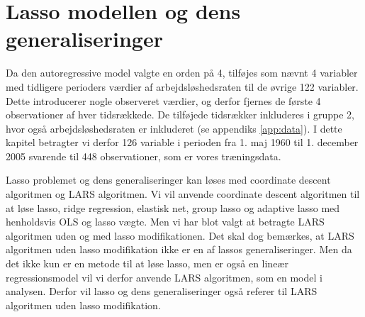 \chapter{Lasso modellen og dens generaliseringer}
Da den autoregressive model valgte en orden på 4, tilføjes som nævnt 
4 variabler med tidligere perioders værdier af arbejdsløshedsraten til de øvrige 122 variabler. 
Dette introducerer nogle observeret værdier, og derfor fjernes de første 4 observationer af hver tidsrækkede.
De tilføjede tidsrækker inkluderes i gruppe 2, hvor også arbejdsløshedsraten er inkluderet (se appendiks \ref{app:data}).
I dette kapitel betragter vi derfor 126 variable i perioden fra 1. maj 1960 til 1. december 2005 svarende til 448 observationer, som er vores træningsdata. 

Lasso problemet og dens generaliseringer kan løses med coordinate descent algoritmen og LARS algoritmen.
Vi vil anvende coordinate descent algoritmen til at løse lasso, ridge regression, elastisk net, group lasso og adaptive lasso med henholdsvis OLS og lasso vægte.
Men vi har blot valgt at betragte LARS algoritmen uden og med lasso modifikationen.
Det skal dog bemærkes, at LARS algoritmen uden lasso modifikation ikke er en af lassos generaliseringer. Men da det ikke kun er en metode til at løse lasso, men er også en lineær regressionsmodel vil vi derfor anvende LARS algoritmen, som en model i analysen.  Derfor vil lasso og dens generaliseringer også referer til LARS algoritmen uden lasso modifikation.  



